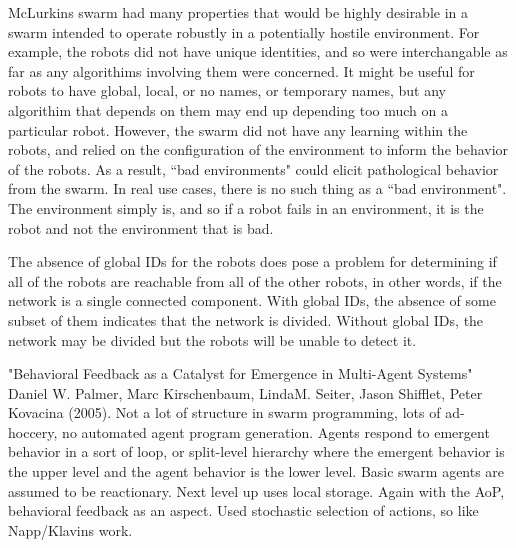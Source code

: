 \documentclass[]{article}
\begin{document}
McLurkins swarm had many properties that would be highly desirable in a swarm intended to operate robustly in a potentially hostile environment. 
For example, the robots did not have unique identities, and so were interchangable as far as any algorithims involving them were concerned. 
It might be useful for robots to have global, local, or no names, or temporary names, but any algorithim that depends on them may end up depending too much on a particular robot. 
However, the swarm did not have any learning within the robots, and relied on the configuration of the environment to inform the behavior of the robots. 
As a result, ``bad environments" could elicit pathological behavior from the swarm. 
In real use cases, there is no such thing as a ``bad environment". 
The environment simply is, and so if a robot fails in an environment, it is the robot and not the environment that is bad. 

The absence of global IDs for the robots does pose a problem for determining if all of the robots are reachable from all of the other robots, in other words, if the network is a single connected component. 
With global IDs, the absence of some subset of them indicates that the network is divided. 
Without global IDs, the network may be divided but the robots will be unable to detect it. 

"Behavioral Feedback as a Catalyst for Emergence in Multi-Agent Systems" \cite{palmer2005behavioral} Daniel W. Palmer, Marc Kirschenbaum, LindaM. Seiter, Jason Shifflet, Peter Kovacina (2005). Not a lot of structure in swarm programming, lots of ad-hoccery, no automated agent program generation. Agents respond to emergent behavior in a sort of loop, or split-level hierarchy where the emergent behavior is the upper level and the agent behavior is the lower level. Basic swarm agents are assumed to be reactionary. Next level up uses local storage. Again with the AoP, behavioral feedback as an aspect. Used stochastic selection of actions, so like Napp/Klavins work. 
\end{document}
